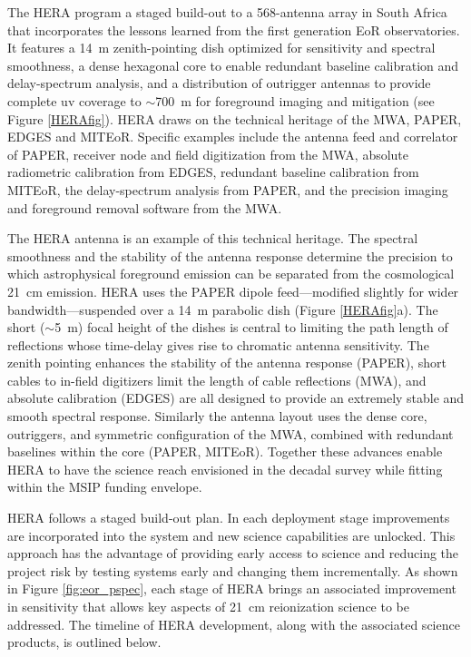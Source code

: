 \documentclass[preprint]{aastex}
\begin{document}
The HERA program a staged build-out to a 568-antenna array in South Africa that incorporates the lessons learned from the first generation EoR observatories. It features a 14~m zenith-pointing dish optimized for sensitivity and spectral smoothness, a dense hexagonal core to enable redundant baseline calibration and delay-spectrum analysis, and a distribution of outrigger antennas to provide complete uv coverage to $\sim$700~m for foreground imaging and mitigation (see Figure \ref{HERAfig}). HERA draws on the technical heritage of the MWA, PAPER, EDGES and MITEoR. Specific examples include the antenna feed and correlator of PAPER, receiver node and field digitization from the MWA, absolute radiometric calibration from EDGES, redundant baseline calibration from MITEoR, the delay-spectrum analysis from PAPER, and the precision imaging and foreground removal software from the MWA.

The HERA antenna is an example of this technical heritage. The spectral smoothness and the stability of the antenna response determine the precision to which astrophysical foreground emission can be separated from the cosmological 21~cm emission. HERA uses the PAPER dipole feed---modified slightly for wider bandwidth---suspended over a 14~m parabolic dish (Figure \ref{HERAfig}a). The short ($\sim$5~m) focal height of the dishes is central to limiting the path length of reflections whose time-delay gives rise to chromatic antenna sensitivity. The zenith pointing enhances the stability of the antenna response (PAPER), short cables to in-field digitizers limit the length of cable reflections (MWA), and absolute calibration (EDGES) are all designed to provide an extremely stable and smooth spectral response. Similarly the antenna layout uses the dense core, outriggers, and symmetric configuration of the MWA, combined with redundant baselines within the core (PAPER, MITEoR). Together these advances enable HERA to have the science reach envisioned in the decadal survey while fitting within the MSIP funding envelope.


HERA follows a staged build-out plan.  In
each deployment stage improvements are incorporated into the system and new
science capabilities are unlocked.  This approach has the advantage of
providing early access to science and reducing the project risk by testing systems
early and changing them incrementally.  As shown in Figure \ref{fig:eor_pspec}, each
stage of HERA brings an associated improvement in sensitivity that allows key
aspects of 21~cm reionization science to be addressed.  The timeline of HERA
development, along with the associated science products, is outlined below. 
\end{document}
